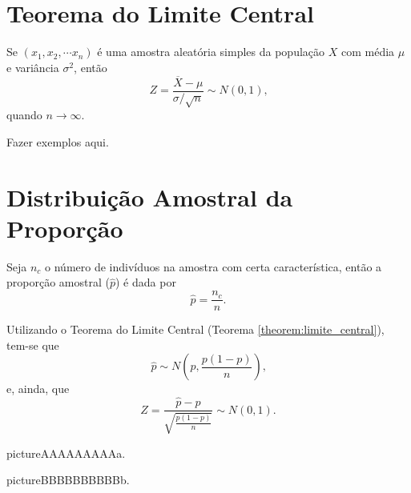 \documentclass[11pt,fleqn]{book}
\numberwithin{mpicture}{chapter}
\numberwithin{mtable}{chapter}
\numberwithin{mframe}{chapter}
\begin{document}
\section{Teorema do Limite Central}

\begin{theorem}
	\label{theorem:limite_central}
	Se $(x_1, x_2, \cdots x_n)$ é uma amostra aleatória simples da população $X$ com média $\mu$ e variância $\sigma^2$, então
	\[
		Z=\frac{\overline{X}-\mu}{\sigma/\sqrt{n}} \sim N(0,1)\text{,}
	\]
	quando $n\to \infty$.
\end{theorem}

{\color{red}Fazer exemplos aqui.}


\section{Distribuição Amostral da Proporção}

Seja $n_c$ o número de indivíduos na amostra com certa característica, então a proporção amostral ($\hat{p}$) é dada por
\[
	\hat{p}=\frac{n_c}{n}
	\text{.}
\]

Utilizando o Teorema do Limite Central (Teorema \ref{theorem:limite_central}), tem-se que
\[
	\hat{p}\sim N\left (p, \frac{p(1-p)}{n}\right )\text{,}
\]
e, ainda, que
\[
	Z=\frac{\hat{p}-p}{\sqrt{\frac{p(1-p)}{n}}} \sim N(0,1)\text{.}
\]

\begin{sidepicture}{5cm}{picture}{AAAAAAAAAa.}
	\label{fig:cap0:exemplo_amostral_proporcao}
\end{sidepicture}

\begin{sidepicture}{2cm}{picture}{BBBBBBBBBBb.}
	\label{fig:cap0:exemplo_amostral_proporcao_padronizada}
\end{sidepicture}
\end{document}
